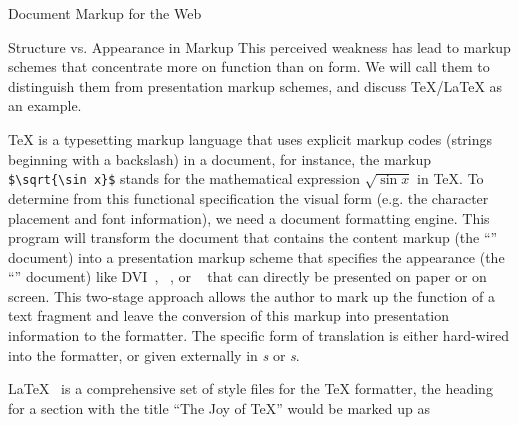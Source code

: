 \begin{tchapter}[id=markup-web]{Document Markup for the Web}
\begin{tsection}[id=markup-types]{Structure vs. Appearance in Markup}
  This perceived weakness has lead to markup schemes that concentrate more on function
  than on form.  We will call them {} to distinguish them from
  presentation markup schemes, and discuss {}
  {\TeX}/{\LaTeX} {\cite{Knuth:ttb84,Lamport:ladps94}} as an example.

  {\TeX} is a typesetting markup language that uses explicit markup codes (strings
  beginning with a backslash) in a document, for instance, the markup
  {\verb|$\sqrt{\sin x}$|} stands for the mathematical expression $\sqrt{\sin x}$ in
  {\TeX}. To determine from this functional specification the visual form (e.g. the
  character placement and font information), we need a document formatting engine.  This
  program will transform the document that contains the content markup (the
  ``{}'' document) into a presentation markup
  scheme that specifies the appearance (the ``{}''
  document) like {DVI}~\cite{Knuth:ttb84},
  {}~\cite{Reid:plpd87}, or {}~\cite{PDFReference} that can
  directly be presented on paper or on screen.  This two-stage approach allows the author
  to mark up the function of a text fragment and leave the conversion of this markup into
  presentation information to the formatter. The specific form of translation is either
  hard-wired into the formatter, or given externally in {\emph{s}} or
  {\emph{s}}.

{\LaTeX}~\cite{Lamport:ladps94} is a comprehensive set of style
files for the {\TeX} formatter, the heading for a section with the title ``The Joy
of {\TeX}'' would be marked up as
\begin{small}
\begin{verbatim}

\end{verbatim}
\end{small}
\end{tsection}
\end{tchapter}
